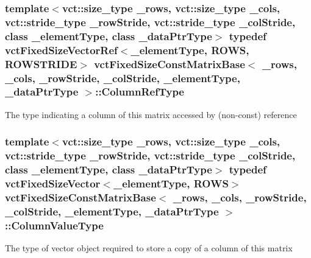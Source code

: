 \subsubsection[{Column\+Ref\+Type}]{\setlength{\rightskip}{0pt plus 5cm}template$<$vct\+::size\+\_\+type \+\_\+rows, vct\+::size\+\_\+type \+\_\+cols, vct\+::stride\+\_\+type \+\_\+row\+Stride, vct\+::stride\+\_\+type \+\_\+col\+Stride, class \+\_\+element\+Type, class \+\_\+data\+Ptr\+Type$>$ typedef {\bf vct\+Fixed\+Size\+Vector\+Ref}$<$\+\_\+element\+Type, {\bf R\+O\+W\+S}, {\bf R\+O\+W\+S\+T\+R\+I\+D\+E}$>$ {\bf vct\+Fixed\+Size\+Const\+Matrix\+Base}$<$ \+\_\+rows, \+\_\+cols, \+\_\+row\+Stride, \+\_\+col\+Stride, \+\_\+element\+Type, \+\_\+data\+Ptr\+Type $>$\+::{\bf Column\+Ref\+Type}}\label{classvct_fixed_size_const_matrix_base_a9cbbc3a040a90709bdeac3b94c766131}
The type indicating a column of this matrix accessed by (non-\/const) reference \hypertarget{classvct_fixed_size_const_matrix_base_a1c4e4fda1ae603282d28745d3ec78493}{}
\subsubsection[{Column\+Value\+Type}]{\setlength{\rightskip}{0pt plus 5cm}template$<$vct\+::size\+\_\+type \+\_\+rows, vct\+::size\+\_\+type \+\_\+cols, vct\+::stride\+\_\+type \+\_\+row\+Stride, vct\+::stride\+\_\+type \+\_\+col\+Stride, class \+\_\+element\+Type, class \+\_\+data\+Ptr\+Type$>$ typedef {\bf vct\+Fixed\+Size\+Vector}$<$\+\_\+element\+Type, {\bf R\+O\+W\+S}$>$ {\bf vct\+Fixed\+Size\+Const\+Matrix\+Base}$<$ \+\_\+rows, \+\_\+cols, \+\_\+row\+Stride, \+\_\+col\+Stride, \+\_\+element\+Type, \+\_\+data\+Ptr\+Type $>$\+::{\bf Column\+Value\+Type}}\label{classvct_fixed_size_const_matrix_base_a1c4e4fda1ae603282d28745d3ec78493}
The type of vector object required to store a copy of a column of this matrix \hypertarget{classvct_fixed_size_const_matrix_base_a896eacc5ccf7915b3e109bf9dbded884}{}
